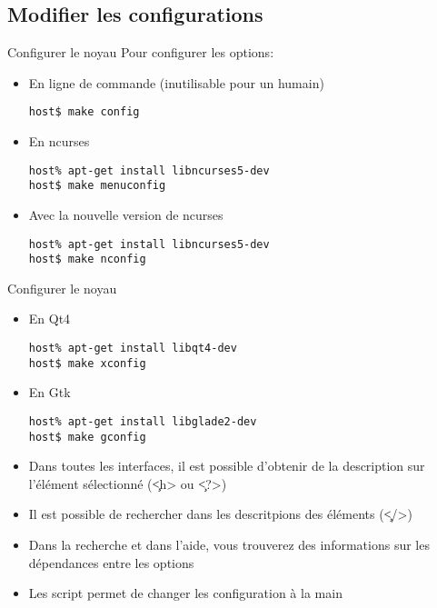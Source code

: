 \subsection{Modifier les configurations}
\begin{frame}[fragile=singleslide]{Configurer le noyau}
 Pour configurer les options:
 \begin{itemize}    
 \item En ligne de commande (inutilisable pour un humain)
   \begin{lstlisting}
host$ make config
   \end{lstlisting} %
 \item En ncurses
   \begin{lstlisting}
host% apt-get install libncurses5-dev
host$ make menuconfig
   \end{lstlisting} %
 \item Avec la nouvelle version de ncurses 
   \begin{lstlisting}
host% apt-get install libncurses5-dev
host$ make nconfig
   \end{lstlisting} %
\end{itemize} 
\end{frame} 

\begin{frame}[fragile=singleslide]{Configurer le noyau}
\begin{itemize} 
 \item En Qt4
   \begin{lstlisting}
host% apt-get install libqt4-dev
host$ make xconfig
   \end{lstlisting} %
 \item En Gtk
   \begin{lstlisting}
host% apt-get install libglade2-dev
host$ make gconfig
   \end{lstlisting} %
 \item Dans  toutes les  interfaces, il est  possible d'obtenir  de la
   description sur l'élément sélectionné (\c{<h>} ou \c{<?>})
 \item  Il  est  possible  de  rechercher dans  les  descritpions  des
   éléments (\c{</>})
 \item  Dans   la  recherche  et  dans  l'aide,   vous  trouverez  des
   informations sur les dépendances entre les options
 \item   Les  script     permet  de   changer  les
   configuration à la main
 \end{itemize}
\end{frame}

